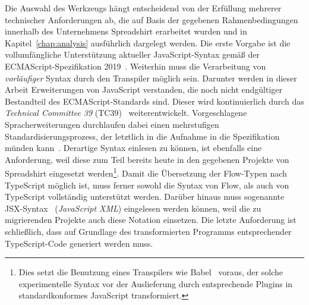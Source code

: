 Die Auswahl des Werkzeugs hängt entscheidend von der Erfüllung mehrerer technischer Anforderungen ab, die auf Basis der gegebenen Rahmenbedingungen innerhalb des Unternehmens Spreadshirt erarbeitet wurden und in Kapitel~\ref{chap:analysis} ausführlich dargelegt werden. Die erste Vorgabe ist die vollumfängliche Unterstützung aktueller JavaScript-Syntax gemäß der ECMAScript-Spezifikation 2019~\autocite{ECMASCRIPT:2019}. Weiterhin muss die Verarbeitung von \emph{vorläufiger} Syntax durch den Transpiler möglich sein. Darunter werden in dieser Arbeit Erweiterungen von JavaScript verstanden, die noch nicht endgültiger Bestandteil des ECMAScript-Standards sind. Dieser wird kontinuierlich durch das \textit{Technical Committee 39} (TC39)~\autocite{TC39_COMMITTEE} weiterentwickelt. Vorgeschlagene Spracherweiterungen durchlaufen dabei einen mehrstufigen Standardisierungsprozess, der letztlich in die Aufnahme in die Spezifikation münden kann~\autocite{TC39_PROCESS}. Derartige Syntax einlesen zu können, ist ebenfalls eine Anforderung, weil diese zum Teil bereits heute in den gegebenen Projekte von Spreadshirt eingesetzt werden\footnote{Dies setzt die Benutzung eines Transpilers wie Babel~\autocite{BABEL} voraus, der solche experimentelle Syntax vor der Auslieferung durch entsprechende Plugins in standardkonformes JavaScript transformiert.}. Damit die Übersetzung der Flow-Typen nach TypeScript möglich ist, muss ferner sowohl die Syntax von Flow, als auch von TypeScript vollständig unterstützt werden. Darüber hinaus muss sogenannte JSX-Syntax~\autocite{SOFTWARE:JSX} (\textit{JavaScript XML}) eingelesen werden können, weil die zu migrierenden Projekte auch diese Notation einsetzen. Die letzte Anforderung ist schließlich, dass auf Grundlage des transformierten Programms entsprechender TypeScript-Code generiert werden muss.



